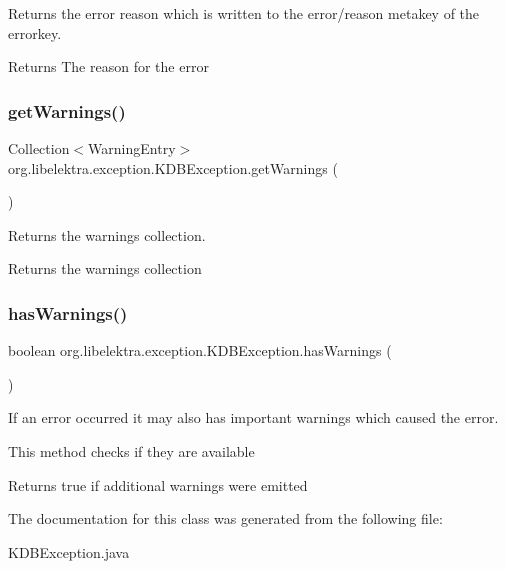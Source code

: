 Returns the error reason which is written to the {\ttfamily error/reason} metakey of the errorkey. 

\begin{DoxyReturn}{Returns}
The reason for the error 
\end{DoxyReturn}
\mbox{\label{classorg_1_1libelektra_1_1exception_1_1KDBException_ae39b71862c220a14f44dff3e5a515239}} 
\subsubsection{\texorpdfstring{getWarnings()}{getWarnings()}}
{\footnotesize\ttfamily Collection$<$Warning\+Entry$>$ org.\+libelektra.\+exception.\+K\+D\+B\+Exception.\+get\+Warnings (\begin{DoxyParamCaption}{ }\end{DoxyParamCaption})\hspace{0.3cm}{\ttfamily [inline]}}



Returns the warnings collection. 

\begin{DoxyReturn}{Returns}
the warnings collection 
\end{DoxyReturn}
\mbox{\label{classorg_1_1libelektra_1_1exception_1_1KDBException_a0387189fd5d08448c81a7777f80f8940}} 
\subsubsection{\texorpdfstring{hasWarnings()}{hasWarnings()}}
{\footnotesize\ttfamily boolean org.\+libelektra.\+exception.\+K\+D\+B\+Exception.\+has\+Warnings (\begin{DoxyParamCaption}{ }\end{DoxyParamCaption})\hspace{0.3cm}{\ttfamily [inline]}}



If an error occurred it may also has important warnings which caused the error. 

This method checks if they are available

\begin{DoxyReturn}{Returns}
true if additional warnings were emitted 
\end{DoxyReturn}


The documentation for this class was generated from the following file\+:\begin{DoxyCompactItemize}
\item 
K\+D\+B\+Exception.\+java\end{DoxyCompactItemize}
